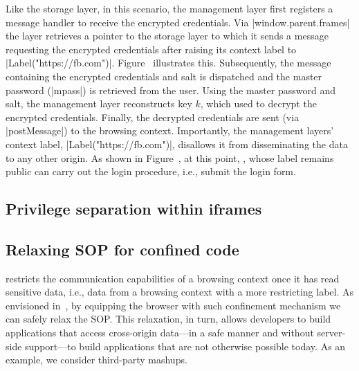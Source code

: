 Like the storage layer, in this scenario, the management layer first
registers a message handler to receive the encrypted credentials.
%
Via \js|window.parent.frames| the layer retrieves a pointer to the
storage layer to which it sends a message requesting the encrypted
credentials after raising its context label to
\js|Label("https://fb.com")|.
%
Figure~ illustrates this.
%
Subsequently, the message containing the encrypted
credentials and salt is dispatched and the
master password (\js|mpass|) is retrieved from the user. 
%
Using the master password and salt, the management layer reconstructs
key $k$, which used to decrypt the encrypted credentials.
%
Finally, the decrypted credentials are sent (via \js|postMessage|) to
the  browsing context.
%
Importantly, the management layers' context label,
\js|Label("https://fb.com")|, disallows it from disseminating the data
to any other origin.
%
As shown in Figure~, at this point,
, whose label remains public can carry out the login
procedure, i.e., submit the login form.


\subsection{Privilege separation within iframes}
\label{sec:system:extension}


\subsection{Relaxing SOP for confined code}
\label{sec:system:mashup}
%
\sys{} restricts the communication capabilities of a browsing context
once it has read sensitive data, i.e., data from a browsing context
with a more restricting label.
%
As envisioned in~, by equipping the browser with such
confinement mechanism we can safely relax the SOP.
%
This relaxation, in turn, allows developers to build applications that access
cross-origin data---in a safe manner and without server-side support---to build
applications that are not otherwise possible today.
%
As an example, we consider third-party mashups.


